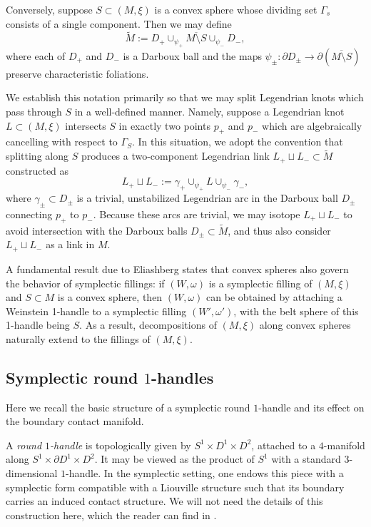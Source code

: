 \documentclass[11pt]{amsart}
\numberwithin{equation}{section}
\theoremstyle{plain}
\theoremstyle{definition}
\theoremstyle{remark}\newtheorem{rem}[equation]{Remark}%
\theoremstyle{remark}\newtheorem{obs}[equation]{Observation}%
\begin{document}
Conversely, suppose $S\subset(M,\xi)$ is a convex sphere whose dividing set $\Gamma_s$ consists of a single component.  Then we may define
\[
\tilde{M} := D_+ \cup_{\psi_+} \overline{M\setminus S} \cup_{\psi_-} D_-,
\]
where each of $D_+$ and $D_-$ is a Darboux ball and the maps $\psi_\pm\colon\partial D_\pm\to\partial(\overline{M\setminus S})$ preserve characteristic foliations.

We establish this notation primarily so that we may split Legendrian knots which pass through $S$ in a well-defined manner.  Namely, suppose a Legendrian knot $L \subset (M,\xi)$ intersects $S$ in exactly two points $p_+$ and $p_-$ which are algebraically cancelling with respect to $\Gamma_S$.  In this situation, we adopt the convention that splitting along $S$ produces a two-component Legendrian link $L_+\sqcup L_- \subset \tilde{M}$ constructed as
\[
L_+ \sqcup L_- := \gamma_+ \cup_{\psi_+} L \cup_{\psi_-} \gamma_-,
\]
where $\gamma_\pm\subset D_\pm$ is a trivial, unstabilized Legendrian arc in the Darboux ball $D_\pm$ connecting $p_+$ to $p_-$.  Because these arcs are trivial, we may isotope $L_+\sqcup L_-$ to avoid intersection with the Darboux balls $D_\pm\subset\tilde{M}$, and thus also consider $L_+\sqcup L_-$ as a link in $M$.

A fundamental result due to Eliashberg \cite{Eli01} states that convex spheres also govern the behavior of symplectic fillings: if $(W,\omega)$ is a symplectic filling of $(M,\xi)$ and $S\subset M$ is a convex sphere, then $(W,\omega)$ can be obtained by attaching a Weinstein 1-handle to a symplectic filling $(W',\omega')$, with the belt sphere of this 1-handle being $S$.  As a result, decompositions of $(M,\xi)$ along convex spheres naturally extend to the fillings of $(M,\xi)$.


\subsection{Symplectic round $1$-handles}

Here we recall the basic structure of a symplectic round $1$-handle and its effect on the boundary contact manifold.  

A \emph{round $1$-handle} is topologically given by $S^{1} \times D^{1} \times D^{2}$, attached to a $4$-manifold along $S^{1} \times \partial D^{1} \times D^{2}$.  It may be viewed as the product of $S^{1}$ with a standard 3-dimensional $1$-handle.  In the symplectic setting, one endows this piece with a symplectic form compatible with a Liouville structure such that its boundary carries an induced contact structure.  We will not need the details of this construction here, which the reader can find in \cite{adachi2014contact,adachi2017round}.
\end{document}
